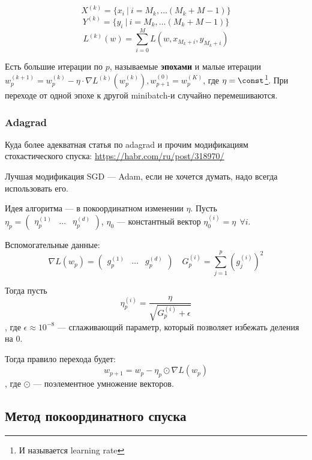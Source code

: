 \[X^{(k)} = \{x_i\ |\ i = M_k, \dots (M_k + M - 1)\}\]
\[Y^{(k)} = \{y_i\ |\ i = M_k, \dots (M_k + M - 1)\}\]
\[L^{(k)}(w) = \sum_{i = 0}^M L(w, x_{M_k + i}, y_{M_k + i})\]


Есть большие итерации по \(p\), называемые \textbf{эпохами} и малые итерации \(w_p^{(k + 1)} = w_p^{(k)} - \eta \cdot \nabla L^{(k)}(w_p^{(k)}), w_{p + 1}^{(0)} = w_p^{(K)}\), где \(\eta = \const\)\footnote{И называется learning rate}. При переходе от одной эпохе к другой minibatch-и случайно перемешиваются.

\subsubsection{Adagrad}

\begin{remark}
    Куда более адекватная статья по adagrad и прочим модификациям стохастического спуска: \href{https://habr.com/ru/post/318970/}{https://habr.com/ru/post/318970/}
\end{remark}

\begin{remark}
    Лучшая модификация SGD --- Adam, если не хочется думать, надо всегда использовать его.
\end{remark}

Идея алгоритма --- в покоординатном изменении \(\eta\). Пусть \(\eta_p = \begin{pmatrix} \eta_p^{(1)} & \dots & \eta_p^{(d)} \end{pmatrix} \), \(\eta_0\) --- константный вектор \(\eta_0^{(i)} = \eta \ \ \forall i\).

Вспомогательные данные:
\[\nabla L(w_p) = \begin{pmatrix} g_p^{(1)} & \dots & g_p^{(d)} \end{pmatrix} \quad G_p^{(i)} = \sum_{j = 1}^p (g_j^{(i)})^2\]

Тогда пусть
\[\eta_p^{(i)} = \frac{\eta}{\sqrt{G^{(i)}_p + \epsilon}}\]
, где \(\epsilon \approx 10^{ - 8}\) --- сглаживающий параметр, который позволяет избежать деления на \(0\).

Тогда правило перехода будет:
\[w_{p + 1} = w_p - \eta_p \odot \nabla L(w_p)\]
, где \(\odot\) --- поэлементное умножение векторов.

\subsection{Метод покоординатного спуска}

